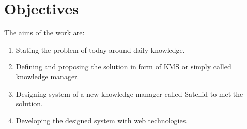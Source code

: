 \section{Objectives}
\label{sec:objectives}

The aims of the work are:

\begin{enumerate}
\item Stating the problem of today around daily knowledge.
\item Defining and proposing the solution in form of \ac{KMS} or simply called knowledge manager.
\item Designing system of a new knowledge manager called Satellid to met the solution.
\item Developing the designed system with web technologies.
\end{enumerate}
